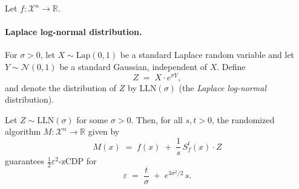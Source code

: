 Let $f:\mathcal{X}^n\to\mathbb{R}$.
  
\paragraph{Laplace log-normal distribution.}
For $\sigma>0$, let $X\sim \mathrm{Lap}(0,1)$ be a standard Laplace random variable and let
$Y\sim\mathcal{N}(0,1)$ be a standard Gaussian, independent of $X$.
Define
\[
Z \;=\; X\cdot e^{\sigma Y},
\]
and denote the distribution of $Z$ by $\mathrm{LLN}(\sigma)$ (the \emph{Laplace log-normal} distribution).

Let $Z\sim \mathrm{LLN}(\sigma)$ for some $\sigma>0$. Then, for all $s,t>0$, the randomized algorithm
$M:\mathcal{X}^n\to\mathbb{R}$ given by
\[
M(x) \;=\; f(x) \;+\; \frac{1}{s}\, S_f^{t}(x)\cdot Z
\]
guarantees $\tfrac{1}{2}\varepsilon^{2}$-zCDP for
\[
\varepsilon \;=\; \frac{t}{\sigma} \;+\; e^{3\sigma^{2}/2}\,s.
\]